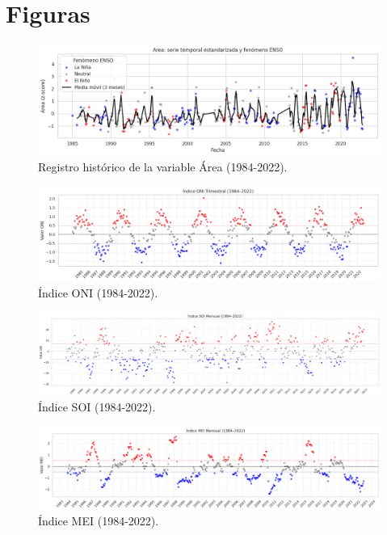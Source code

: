 
\chapter{Figuras} %

\label{AppendixA} %

\begin{figure}[ht]
        \centering
        \includegraphics[scale=.45]
        {Figures/fig16_ts_area.png}
        \caption{Registro histórico de la variable Área (1984-2022).}
        \label{fig:indice_area}
\end{figure}


\begin{figure}[ht]
        \centering
        \includegraphics[scale=.38]
        {Figures/fig13_oni.png}
        \caption{Índice ONI (1984-2022).}
        \label{fig:indice_oni}
\end{figure}

\begin{figure}[ht]
        \centering
        \includegraphics[scale=.26]
        {Figures/fig14_soi.png}
        \caption{Índice SOI (1984-2022).}
        \label{fig:indice_soi}
\end{figure}

\begin{figure}[ht]
        \centering
        \includegraphics[scale=.32]
        {Figures/fig15_mei.png}
        \caption{Índice MEI (1984-2022).}
        \label{fig:indice_mei}
\end{figure}

